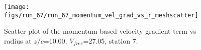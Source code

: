 \begin{figure}[H]
\centering
\texttt{[image: figs/run\_67/run\_67\_momentum\_vel\_grad\_vs\_r\_meshscatter]}
\caption{Scatter plot of the momentum based velocity gradient term vs radius at $z/c$=10.00, $V_{free}$=27.05, station 7.}
\label{fig:run_67_momentum_vel_grad_vs_r_meshscatter}
\end{figure}


